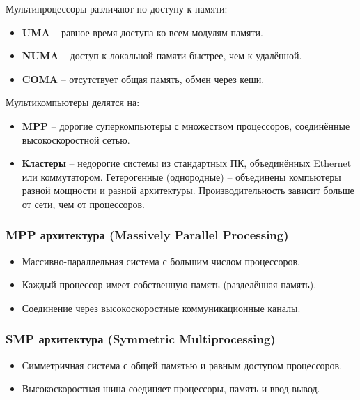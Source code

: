 	\newpage
	
	Мультипроцессоры различают по доступу к памяти:
	\begin{itemize}
		\item \textbf{UMA} -- равное время доступа ко всем модулям памяти.
		\item \textbf{NUMA} -- доступ к локальной памяти быстрее, чем к удалённой.
		\item \textbf{COMA} -- отсутствует общая память, обмен через кеши.
	\end{itemize}
	
	Мультикомпьютеры делятся на:
	\begin{itemize}[leftmargin=1.5em]
		\item \textbf{MPP} -- дорогие суперкомпьютеры с множеством процессоров, соединённые высокоскоростной сетью.
		\item \textbf{Кластеры} -- недорогие системы из стандартных ПК, объединённых Ethernet или коммутатором. 
		\newline
		\uline {Гетерогенные (однородные)} -- объединены компьютеры разной мощности и разной архитектуры. 
		\newline
		Производительность зависит больше от сети, чем от процессоров.
    \end{itemize}
	
	\subsubsection{MPP архитектура (Massively Parallel Processing)}
	\begin{itemize}
		\item Массивно-параллельная система с большим числом процессоров.
		\item Каждый процессор имеет собственную память (разделённая память).
		\item Соединение через высокоскоростные коммуникационные каналы.
	\end{itemize}

	\subsubsection{SMP архитектура (Symmetric Multiprocessing)}
	\begin{itemize}
		\item Симметричная система с общей памятью и равным доступом процессоров.
		\item Высокоскоростная шина соединяет процессоры, память и ввод-вывод.
	\end{itemize}
	
